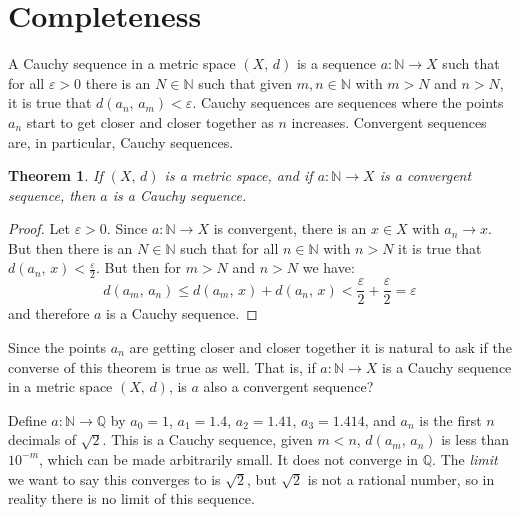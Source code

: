 \documentclass{article}
\theoremstyle{plain}
\newtheorem{theorem}{Theorem}[section]
\theoremstyle{normal}
\newenvironment{example}{%
    \pushQED{\qed}\renewcommand{\qedsymbol}{$\blacksquare$}\examplex%
}{%
    \popQED\endexamplex%
}
\newenvironment{definition}{%
    \pushQED{\qed}\renewcommand{\qedsymbol}{$\blacksquare$}\definitionx%
}{%
    \popQED\enddefinitionx%
}
\begin{document}
    \section{Completeness}
        \begin{definition}[\textbf{Cauchy Sequences}]
            A Cauchy sequence in a metric space $(X,\,d)$ is a sequence
            $a:\mathbb{N}\rightarrow{X}$ such that for all $\varepsilon>0$ there
            is an $N\in\mathbb{N}$ such that given $m,n\in\mathbb{N}$ with
            $m>N$ and $n>N$, it is true that $d(a_{n},\,a_{m})<\varepsilon$.
        \end{definition}
        Cauchy sequences are sequences where the points $a_{n}$ start to get
        closer and closer together as $n$ increases. Convergent sequences are,
        in particular, Cauchy sequences.
        \begin{theorem}
            If $(X,\,d)$ is a metric space, and if $a:\mathbb{N}\rightarrow{X}$
            is a convergent sequence, then $a$ is a Cauchy sequence.
        \end{theorem}
        \begin{proof}
            Let $\varepsilon>0$. Since $a:\mathbb{N}\rightarrow{X}$ is
            convergent, there is an $x\in{X}$ with $a_{n}\rightarrow{x}$. But
            then there is an $N\in\mathbb{N}$ such that for all $n\in\mathbb{N}$
            with $n>N$ it is true that $d(a_{n},\,x)<\frac{\varepsilon}{2}$.
            But then for $m>N$ and $n>N$ we have:
            \begin{equation}
                d(a_{m},\,a_{n})\leq
                d(a_{m},\,x)+d(a_{n},\,x)<
                \frac{\varepsilon}{2}+\frac{\varepsilon}{2}
                =\varepsilon
            \end{equation}
            and therefore $a$ is a Cauchy sequence.
        \end{proof}
        Since the points $a_{n}$ are getting closer and closer together it is
        natural to ask if the converse of this theorem is true as well. That is,
        if $a:\mathbb{N}\rightarrow{X}$ is a Cauchy sequence in a metric space
        $(X,\,d)$, is $a$ also a convergent sequence?
        \begin{example}
            Define $a:\mathbb{N}\rightarrow\mathbb{Q}$ by
            $a_{0}=1$, $a_{1}=1.4$, $a_{2}=1.41$, $a_{3}=1.414$, and
            $a_{n}$ is the first $n$ decimals of $\sqrt{2}$. This is a
            Cauchy sequence, given $m<n$,
            $d(a_{m},\,a_{n})$ is less than $10^{-m}$, which can be made
            arbitrarily small. It does not converge in $\mathbb{Q}$. The
            \textit{limit} we want to say this converges to is
            $\sqrt{2}$, but $\sqrt{2}$ is not a rational number, so in reality
            there is no limit of this sequence.
        \end{example}
\end{document}
